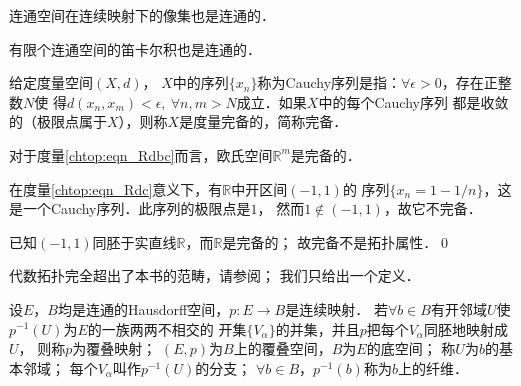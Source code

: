 \begin{proposition}
    连通空间在连续映射下的像集也是连通的．
\end{proposition}

\begin{proposition}
    有限个连通空间的笛卡尔积也是连通的．
\end{proposition}


\begin{definition}\label{chtop:def_complete-metric}
    给定度量空间$(X,d)$，
    $X$中的序列$\{x_n\}$称为Cauchy序列是指：$\forall \epsilon >0 $，存在正整数$N$使
    得$d(x_n,x_m)<\epsilon,\ \forall n,m>N$成立．如果$X$中的每个Cauchy序列
    都是收敛的（极限点属于$X$），则称$X$是{\heiti 度量完备}的，简称{\heiti 完备}．
     
\end{definition}

\begin{proposition}
    对于度量\eqref{chtop:eqn_Rdbc}而言，欧氏空间$\mathbb{R}^m$是完备的．
\end{proposition}

\begin{example}
    在度量\eqref{chtop:eqn_Rdc}意义下，有$\mathbb{R}$中开区间$(-1,1)$的
    序列$\{x_n=1-1/n\}$，这是一个Cauchy序列．此序列的极限点是$1$，
    然而$1 \notin (-1,1)$，故它不完备．
    
    已知$(-1,1)$同胚于实直线$\mathbb{R}$，而$\mathbb{R}$是完备的；
    故{\kaishu 完备不是拓扑属性}．\qed
\end{example}


代数拓扑完全超出了本书的范畴，请参阅\parencite{munkres-2000-topology}；
我们只给出一个定义．

\begin{definition}\label{chtop:def_covering-map}
    设$E，B$均是连通的Hausdorff空间，$p:E\to B$是连续映射．
    若$\forall b\in B$有开邻域$U$使$p^{-1}(U)$为$E$的一族两两不相交的
    开集$\{V_\alpha\}$的并集，并且$p$把每个$V_\alpha$同胚地映射成$U$，
    则称$p$为{\heiti 覆叠映射}；
    $(E,p)$为$B$上的{\heiti 覆叠空间}，$B$为$E$的{\heiti 底空间}；
    称$U$为$b$的{\heiti 基本邻域}；
    每个$V_\alpha$叫作$p^{-1}(U)$的{\heiti 分支}；
    $\forall b\in B$，$p^{-1}(b)$称为$b$上的{\heiti 纤维}．
     
\end{definition}

